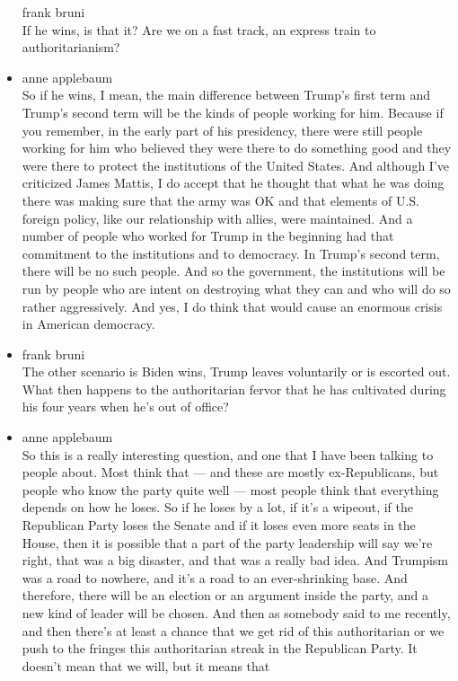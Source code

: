 \begin{itemize}
  frank bruni\\
  If he wins, is that it? Are we on a fast track, an express train to
  authoritarianism?
\item
  anne applebaum\\
  So if he wins, I mean, the main difference between Trump's first term
  and Trump's second term will be the kinds of people working for him.
  Because if you remember, in the early part of his presidency, there
  were still people working for him who believed they were there to do
  something good and they were there to protect the institutions of the
  United States. And although I've criticized James Mattis, I do accept
  that he thought that what he was doing there was making sure that the
  army was OK and that elements of U.S. foreign policy, like our
  relationship with allies, were maintained. And a number of people who
  worked for Trump in the beginning had that commitment to the
  institutions and to democracy. In Trump's second term, there will be
  no such people. And so the government, the institutions will be run by
  people who are intent on destroying what they can and who will do so
  rather aggressively. And yes, I do think that would cause an enormous
  crisis in American democracy.
\item
  frank bruni\\
  The other scenario is Biden wins, Trump leaves voluntarily or is
  escorted out. What then happens to the authoritarian fervor that he
  has cultivated during his four years when he's out of office?
\item
  anne applebaum\\
  So this is a really interesting question, and one that I have been
  talking to people about. Most think that --- and these are mostly
  ex-Republicans, but people who know the party quite well --- most
  people think that everything depends on how he loses. So if he loses
  by a lot, if it's a wipeout, if the Republican Party loses the Senate
  and if it loses even more seats in the House, then it is possible that
  a part of the party leadership will say we're right, that was a big
  disaster, and that was a really bad idea. And Trumpism was a road to
  nowhere, and it's a road to an ever-shrinking base. And therefore,
  there will be an election or an argument inside the party, and a new
  kind of leader will be chosen. And then as somebody said to me
  recently, and then there's at least a chance that we get rid of this
  authoritarian or we push to the fringes this authoritarian streak in
  the Republican Party. It doesn't mean that we will, but it means that

\end{itemize}
